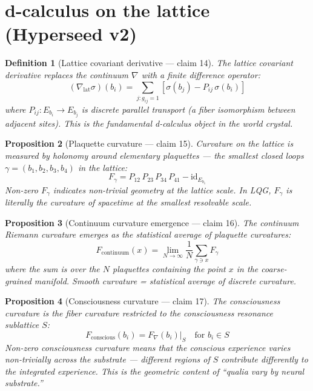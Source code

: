 \documentclass[11pt,a4paper]{article}
\newtheorem{definition}{Definition}[section]
\newtheorem{proposition}[definition]{Proposition}
\begin{document}
\section{d-calculus on the lattice (Hyperseed v2)}

\begin{definition}[Lattice covariant derivative --- claim 14]
The \emph{lattice covariant derivative} replaces the continuum
$\nabla$ with a finite difference operator:
\[
  (\nabla_{\text{lat}} \sigma)(b_i) = \sum_{j: g_{ij}=1}
    \left[\sigma(b_j) - P_{ij}\, \sigma(b_i)\right]
\]
where $P_{ij}: E_{b_i} \to E_{b_j}$ is discrete parallel transport
(a fiber isomorphism between adjacent sites). This is the fundamental
d-calculus object in the world crystal.
\end{definition}

\begin{proposition}[Plaquette curvature --- claim 15]
\label{prop:plaquette}
Curvature on the lattice is measured by holonomy around elementary
plaquettes --- the smallest closed loops $\gamma = (b_1, b_2, b_3, b_4)$
in the lattice:
\[
  F_{\gamma} = P_{12}\, P_{23}\, P_{34}\, P_{41} - \mathrm{id}_{E_{b_1}}
\]
Non-zero $F_\gamma$ indicates non-trivial geometry at the lattice scale.
In LQG, $F_\gamma$ is literally the curvature of spacetime at the
smallest resolvable scale.
\end{proposition}

\begin{proposition}[Continuum curvature emergence --- claim 16]
\label{prop:continuum-curv}
The continuum Riemann curvature emerges as the statistical average of
plaquette curvatures:
\[
  F_{\text{continuum}}(x) = \lim_{N \to \infty}
    \frac{1}{N} \sum_{\gamma \ni x} F_\gamma
\]
where the sum is over the $N$ plaquettes containing the point $x$ in the
coarse-grained manifold. Smooth curvature = statistical average of
discrete curvature.
\end{proposition}

\begin{proposition}[Consciousness curvature --- claim 17]
\label{prop:consciousness-curv}
The \emph{consciousness curvature} is the fiber curvature restricted
to the consciousness resonance sublattice $S$:
\[
  F_{\text{conscious}}(b_i) = F_\nabla(b_i)\big|_{S}
  \quad \text{for } b_i \in S
\]
Non-zero consciousness curvature means that the conscious experience
varies non-trivially across the substrate --- different regions of $S$
contribute differently to the integrated experience. This is the
geometric content of ``qualia vary by neural substrate.''
\end{proposition}
\end{document}
